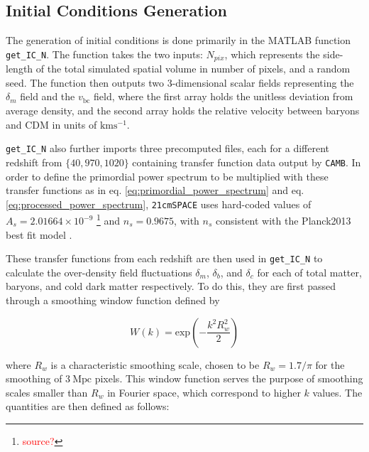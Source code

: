 \documentclass[floats,floatfix,showpacs,amssymb,prd,superscriptaddress,nofootinbib]{revtex4-2} %
\newcommand{\code}{\texttt}
\newcommand{\red}{\textcolor{red}}
\begin{document}
\subsection{Initial Conditions Generation}

The generation of initial conditions is done primarily in the MATLAB function \code{get\_IC\_N}. The function takes the two inputs: $N_{pix}$, which represents the side-length of the total simulated spatial volume in number of pixels, and a random seed. The function then outputs two 3-dimensional scalar fields representing the $\delta_m$ field and the $v_{\text{bc}}$ field, where the first array holds the unitless deviation from average density, and the second array holds the relative velocity between baryons and CDM in units of $\text{km} \text{s}^{-1}$. 

\code{get\_IC\_N} also further imports three precomputed files, each for a different redshift from $\{40, 970, 1020\}$ containing transfer function data output by \code{CAMB}. In order to define the primordial power spectrum to be multiplied with these transfer functions as in eq. \ref{eq:primordial_power_spectrum} and eq. \ref{eq:processed_power_spectrum}, \code{21cmSPACE} uses hard-coded values of $A_s = 2.01664 \times 10^{-9}$ \footnote{\red{source?}} and $n_s = 0.9675$, with $n_s$ consistent with the Planck2013 best fit model \citep{Planck2013results}. 

These transfer functions from each redshift are then used in \code{get\_IC\_N} to calculate the over-density field fluctuations $\delta_m$, $\delta_b$, and $\delta_c$ for each of total matter, baryons, and cold dark matter respectively. To do this, they are first passed through a smoothing window function defined by 

\begin{equation}
    W(k) = \text{exp}\left( -\frac{k^2 R_w ^2}{2} \right)
\end{equation}

\noindent where $R_w$ is a characteristic smoothing scale, chosen to be $R_w = 1.7 / \pi$ for the smoothing of $3 ~\text{Mpc}$ pixels.
This window function serves the purpose of smoothing scales smaller than $R_w$ in Fourier space, which correspond to higher $k$ values. The quantities are then defined as follows:
\end{document}

